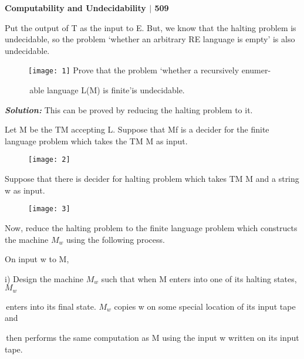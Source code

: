 \documentclass[10pt,a4paper]{book}
\begin{document}
\footnotesize

\begin{flushright}
  \textsf{\textbf{Computability and Undecidability $|$ 509}}
\end{flushright}

\quad

Put the output of T as the input to E. But, we know that the halting problem is undecidable, so the problem ‘whether an arbitrary RE language is empty’ is also undecidable.

\begin{flushleft}
\begin{figure}[h]
  \texttt{[image: 1]} Prove that the problem ‘whether a recursively enumer-
  
  \qquad\qquad\qquad\qquad\qquad\,able language L(M) is finite’is undecidable.
\end{figure}
\end{flushleft}

\textbf{\textit{\!\!\!\!\!\!\!\!\!\!Solution:}} This can be proved by reducing the halting problem to it.

Let M be the TM accepting L. Suppose that Mf is a decider for the finite language problem which
takes the TM M as input.

\begin{figure}[h]
  \centering
  \texttt{[image: 2]}\\
\end{figure}
\!\!\!\!\!\!\!\!\!\!Suppose that there is decider for halting problem which takes TM M and a string w as input.

\begin{figure}[h]
  \centering
  \texttt{[image: 3]}\\
\end{figure}

Now, reduce the halting problem to the finite language problem which constructs the machine $M_{w}$ using the following process.

On input w to M,

\quad

i)\; Design the machine $M_{w}$ such that when M enters into one of its halting states, $M_{w}$ 

\quad\,enters into its final state. $M_{w}$ copies w on some special location of its input tape and 

\quad\,then performs the same computation as M using the input w written on its input tape.
\end{document}
